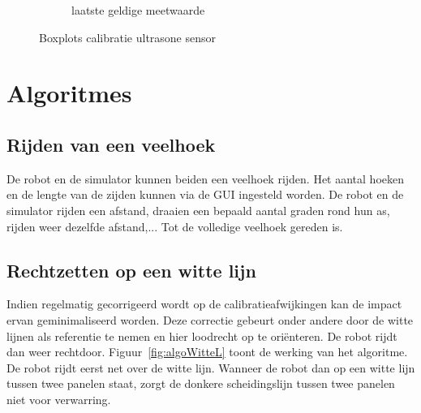 \documentclass[eind]{penoverslag}
\begin{document}
\begin{figure}
\begin{subfigure}[h]{0.31\textwidth}
                \caption{laatste geldige meetwaarde}
        \end{subfigure}
 \caption{Boxplots calibratie ultrasone sensor}
\label{fig:calibUS}
\end{figure}



\section{Algoritmes} %
\label{sec:algo}
\subsection{Rijden van een veelhoek} %
\label{ssec:algoVeelH}
De robot en de simulator kunnen beiden een veelhoek rijden. Het aantal hoeken en de lengte van de zijden kunnen via de GUI ingesteld worden. De robot en de simulator rijden een afstand, draaien een bepaald aantal graden rond hun as, rijden weer dezelfde afstand,... Tot de volledige veelhoek gereden is.

\subsection{Rechtzetten op een witte lijn} %
\label{ssec:algoWitteL}
Indien regelmatig gecorrigeerd wordt op de calibratieafwijkingen kan de impact ervan geminimaliseerd worden. Deze correctie gebeurt onder andere door de witte lijnen als referentie te nemen en hier loodrecht op te ori\"enteren. De robot rijdt dan weer rechtdoor. Figuur~\ref{fig:algoWitteL} toont de werking van het algoritme. De robot rijdt eerst net over de witte lijn. Wanneer de robot dan op een witte lijn tussen twee panelen staat, zorgt de donkere scheidingslijn tussen twee panelen niet voor verwarring.
\end{document}

